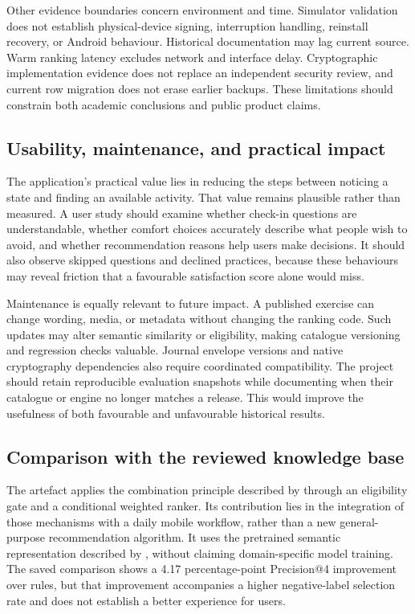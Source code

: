 Other evidence boundaries concern environment and time. Simulator validation does not establish physical-device signing, interruption handling, reinstall recovery, or Android behaviour. Historical documentation may lag current source. Warm ranking latency excludes network and interface delay. Cryptographic implementation evidence does not replace an independent security review, and current row migration does not erase earlier backups. These limitations should constrain both academic conclusions and public product claims.

\subsection{Usability, maintenance, and practical impact}

The application's practical value lies in reducing the steps between noticing a state and finding an available activity. That value remains plausible rather than measured. A user study should examine whether check-in questions are understandable, whether comfort choices accurately describe what people wish to avoid, and whether recommendation reasons help users make decisions. It should also observe skipped questions and declined practices, because these behaviours may reveal friction that a favourable satisfaction score alone would miss.

Maintenance is equally relevant to future impact. A published exercise can change wording, media, or metadata without changing the ranking code. Such updates may alter semantic similarity or eligibility, making catalogue versioning and regression checks valuable. Journal envelope versions and native cryptography dependencies also require coordinated compatibility. The project should retain reproducible evaluation snapshots while documenting when their catalogue or engine no longer matches a release. This would improve the usefulness of both favourable and unfavourable historical results.

\subsection{Comparison with the reviewed knowledge base}

The artefact applies the combination principle described by \citet{burke2002} through an eligibility gate and a conditional weighted ranker. Its contribution lies in the integration of those mechanisms with a daily mobile workflow, rather than a new general-purpose recommendation algorithm. It uses the pretrained semantic representation described by \citet{reimers2019}, without claiming domain-specific model training. The saved comparison shows a 4.17 percentage-point Precision@4 improvement over rules, but that improvement accompanies a higher negative-label selection rate and does not establish a better experience for users.

